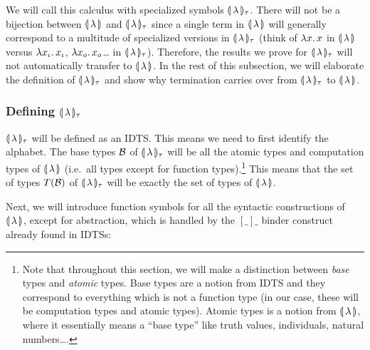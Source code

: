 We will call this calculus with specialized symbols
$\llparenthesis \, \lambda \, \rrparenthesis_\tau$. There will not be a bijection between
$\llparenthesis \, \lambda \, \rrparenthesis$ and $\llparenthesis \, \lambda \, \rrparenthesis_\tau$ since a single term in
$\llparenthesis \, \lambda \, \rrparenthesis$ will generally correspond to a multitude of specialized
versions in $\llparenthesis \, \lambda \, \rrparenthesis_\tau$ (think of $\lambda x.\, x$ in
$\llparenthesis \, \lambda \, \rrparenthesis$ versus $\lambda x_\iota.\, x_\iota$, $\lambda x_o.\, x_o$\ldots
in $\llparenthesis \, \lambda \, \rrparenthesis_\tau$). Therefore, the results we prove for
$\llparenthesis \, \lambda \, \rrparenthesis_\tau$ will not automatically transfer to
$\llparenthesis \, \lambda \, \rrparenthesis$. In the rest of this subsection, we will elaborate the
definition of $\llparenthesis \, \lambda \, \rrparenthesis_\tau$ and show why termination carries over
from $\llparenthesis \, \lambda \, \rrparenthesis_\tau$ to $\llparenthesis \, \lambda \, \rrparenthesis$.


\subsubsection{Defining $\llparenthesis \, \lambda \, \rrparenthesis_\tau$}
\label{sssec:banana-tau}

$\llparenthesis \, \lambda \, \rrparenthesis_\tau$ will be defined as an IDTS. This means we need to
first identify the alphabet. The base types $\mathcal{B}$ of
$\llparenthesis \, \lambda \, \rrparenthesis_\tau$ will be all the atomic types and computation types
of $\llparenthesis \, \lambda \, \rrparenthesis$ (i.e.\ all types except for function
types).\footnote{Note that throughout this section, we will make a
  distinction between \emph{base} types and \emph{atomic} types. Base types
  are a notion from IDTS and they correspond to everything which is not a
  function type (in our case, these will be computation types and atomic
  types). Atomic types is a notion from $\llparenthesis \, \lambda \, \rrparenthesis$, where it
  essentially means a ``base type'' like truth values, individuals, natural
  numbers\ldots.} This means that the set of types $T(\mathcal{B})$ of
$\llparenthesis \, \lambda \, \rrparenthesis_\tau$ will be exactly the set of types of
$\llparenthesis \, \lambda \, \rrparenthesis$.

Next, we will introduce function symbols for all the syntactic
constructions of $\llparenthesis \, \lambda \, \rrparenthesis$, except for abstraction, which is
handled by the $[\_]\_$ binder construct already found in IDTSs:

